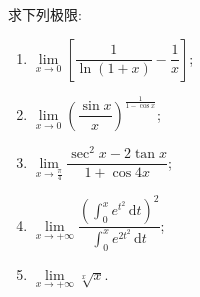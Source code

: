 \begin{example}
    求下列极限:
    \begin{enumerate}
        \item $\displaystyle
                  \lim\limits_{x\to0}
                  \left[\dfrac{1}{\ln(1+x)}-\dfrac{1}{x}\right]$;
        \item $\displaystyle
                  \lim\limits_{x\to0}
                  \left(\dfrac{\sin x}{x}\right)^{\frac{1}{1-\cos x}}$;
        \item $\displaystyle
                  \lim\limits_{x\to\frac{\pi}{4}}
                  \dfrac{\sec^2x-2\tan x}{1+\cos4x}$;
        \item $\displaystyle
                  \lim\limits_{x\to+\infty}
                  \dfrac{\displaystyle\left(\int_0^x e^{t^2}\,\mathrm{d}t\right)^2}
                  {\displaystyle\int_0^x e^{2t^2}\,\mathrm{d}t}$;
        \item $\displaystyle
                  \lim\limits_{x\to+\infty}\sqrt[x]{x}$.
    \end{enumerate}
\end{example}
\exampleblank

